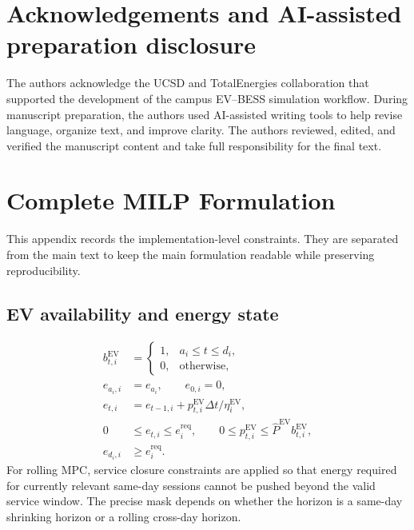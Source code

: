 \documentclass[final,5p,times]{elsarticle}
\newcommand{\DeltaT}{\Delta t}
\newcommand{\EV}{\mathrm{EV}}
\newcommand{\req}{\mathrm{req}}
\begin{document}
\section*{Acknowledgements and AI-assisted preparation disclosure}
The authors acknowledge the UCSD and TotalEnergies collaboration that supported the development of the campus EV--BESS simulation workflow. During manuscript preparation, the authors used AI-assisted writing tools to help revise language, organize text, and improve clarity. The authors reviewed, edited, and verified the manuscript content and take full responsibility for the final text.

\appendix
\section{Complete MILP Formulation}
\label{app:complete_milp}

This appendix records the implementation-level constraints. They are separated from the main text to keep the main formulation readable while preserving reproducibility.

\subsection{EV availability and energy state}
\begin{align}
b_{t,i}^{\EV} &= \begin{cases}1, & a_i\le t\le d_i,\\0, & \text{otherwise},\end{cases}\label{eq:app_ev_avail}\\
e_{a_i,i} &= e_{a_i},\qquad e_{0,i}=0,\label{eq:app_ev_init}\\
e_{t,i} &= e_{t-1,i}+p_{t,i}^{\EV}\DeltaT/\eta_i^{\EV},\label{eq:app_ev_dyn}\\
0&\le e_{t,i}\le e_i^{\req},\qquad
0\le p_{t,i}^{\EV}\le \hat P^{\EV}b_{t,i}^{\EV},\label{eq:app_ev_bounds}\\
e_{d_i,i}&\ge e_i^{\req}.\label{eq:app_ev_req}
\end{align}
For rolling MPC, service closure constraints are applied so that energy required for currently relevant same-day sessions cannot be pushed beyond the valid service window. The precise mask depends on whether the horizon is a same-day shrinking horizon or a rolling cross-day horizon.
\end{document}
